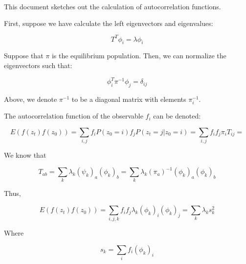 \documentclass[12pt]{article}
\begin{document}
This document sketches out the calculation of autocorrelation functions.  


First, suppose we have calculate the left eigenvectors and eigenvalues:

$$T^T \phi_i = \lambda \phi_i$$

Suppose that $\pi$ is the equilibrium population.  Then, we can normalize the eigenvectors such that:

$$\phi_i^T \pi^{-1} \phi_j = \delta_{ij}$$

Above, we denote $\pi^{-1}$ to be a diagonal matrix with elements $\pi_i^{-1}$.

The autocorrelation function of the observable $f_i$ can be denoted:

$$E(f(z_t) f(z_0)) = \sum_{i,j} f_i P(z_0 = i) f_j P(z_t = j | z_0 = i) = \sum_{i,j} f_i  f_j \pi_i T_{ij} = $$

We know that

$$T_{ab} = \sum_k \lambda_k (\psi_k)_a (\phi_k)_b = \sum_k \lambda_k (\pi_a)^{-1} (\phi_k)_a (\phi_k)_b$$

Thus,

$$E(f(z_t) f(z_0)) = \sum_{i,j,k} f_i f_j \lambda_k (\phi_k)_i (\phi_k)_j = \sum_k \lambda_k s_k^2$$

Where 

$$s_k = \sum_i f_i (\phi_k)_i$$
\end{document}
